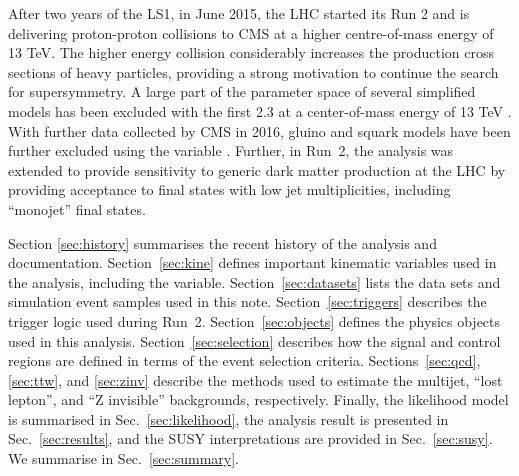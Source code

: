 After two years of the LS1, in June 2015, the LHC started its Run 2
and is delivering proton-proton collisions to CMS at a higher
centre-of-mass energy of 13 TeV. The higher energy collision
considerably increases the production cross sections of heavy
particles, providing a strong motivation to continue the search for
supersymmetry.  A large part of the parameter space of several
simplified models has been excluded with the first 2.3 \ifb at a
center-of-mass energy of 13 TeV \cite{Khachatryan:2016dvc}.  With
further data collected by CMS in 2016, gluino and squark models have
been further excluded using the \alphat variable
\cite{CMS-PAS-SUS-16-016}. Further, in Run~2, the analysis was
extended to provide sensitivity to generic dark matter production at
the LHC by providing acceptance to final states with low jet
multiplicities, including ``monojet'' final states.

Section \ref{sec:history} summarises the recent history of the
analysis and documentation. Section~\ref{sec:kine} defines important
kinematic variables used in the analysis, including the \alphat
variable. Section~\ref{sec:datasets} lists the data sets and
simulation event samples used in this note. Section~\ref{sec:triggers}
describes the trigger logic used during
Run~2. Section~\ref{sec:objects} defines the physics objects used in
this analysis. Section~\ref{sec:selection} describes how the signal
and control regions are defined in terms of the event selection
criteria. Sections~\ref{sec:qcd}, \ref{sec:ttw}, and \ref{sec:zinv}
describe the methods used to estimate the multijet, ``lost lepton'',
and ``Z invisible'' backgrounds, respectively. Finally, the likelihood
model is summarised in Sec.~\ref{sec:likelihood}, the analysis result
is presented in Sec.~\ref{sec:results}, and the SUSY interpretations
are provided in Sec.~\ref{sec:susy}. We summarise in
Sec.~\ref{sec:summary}.


